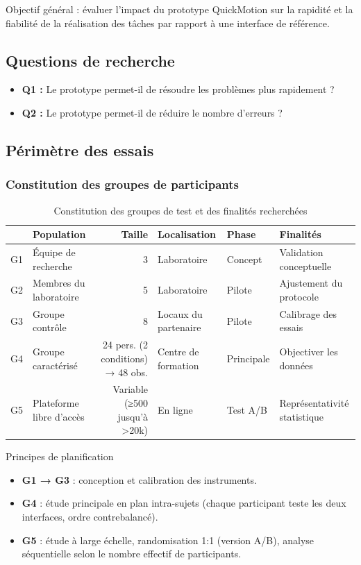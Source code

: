 \documentclass[a4paper,12pt]{article}
\begin{document}
Objectif général : évaluer l’impact du prototype QuickMotion sur la rapidité et la fiabilité de la réalisation des tâches par rapport à une interface de référence.
\subsection{Questions de recherche}
\label{sec:orgf45744c}
\begin{itemize}
\item \textbf{\textbf{Q1 :}} Le prototype permet-il de résoudre les problèmes plus rapidement ?
\item \textbf{\textbf{Q2 :}} Le prototype permet-il de réduire le nombre d’erreurs ?
\end{itemize}
\subsection{Périmètre des essais}
\label{sec:org8c05ab9}
\subsubsection{Constitution des groupes de participants}
\label{sec:org95c6a4c}
\begin{table}[htbp]
\caption{\label{tab:orgb426b9c}Constitution des groupes de test et des finalités recherchées}
\centering
\begin{tabular}{llrlll}
 & Population & Taille & Localisation & Phase & Finalités\\
\hline
G1 & Équipe de recherche & 3 & Laboratoire & Concept & Validation conceptuelle\\
G2 & Membres du laboratoire & 5 & Laboratoire & Pilote & Ajustement du protocole\\
G3 & Groupe contrôle & 8 & Locaux du partenaire & Pilote & Calibrage des essais\\
G4 & Groupe caractérisé & 24 pers. (2 conditions) → 48 obs. & Centre de formation & Principale & Objectiver les données\\
G5 & Plateforme libre d’accès & Variable (≥500 jusqu’à >20k) & En ligne & Test A/B & Représentativité statistique\\
\end{tabular}
\end{table}

Principes de planification
\begin{itemize}
\item \textbf{G1 → G3} : conception et calibration des instruments.
\item \textbf{G4} : étude principale en plan intra-sujets (chaque participant teste les deux interfaces, ordre contrebalancé).
\item \textbf{G5} : étude à large échelle, randomisation 1:1 (version A/B), analyse séquentielle selon le nombre effectif de participants.
\end{itemize}
\end{document}
